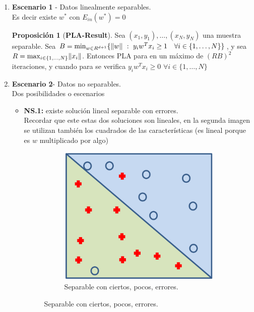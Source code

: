 \documentclass[11pt,a4paper]{article}
\DeclarePairedDelimiter{\norm}{\lVert}{\rVert}
\theoremstyle{definition}
\newtheorem{proposition}{Proposición}[section]
\begin{document}
	\begin{enumerate}
	\item \textbf{Escenario 1} - Datos linealmente separables.\\
	Es decir existe $w^*$ con $E_{in}(w^*)=0$
	\begin{proposition}[\hypertarget{plaResult}{\bf PLA-Result}]
		Sea $(x_1,y_1),\ldots,(x_N,y_N)$ una muestra separable. Sea $B=\min_{w\in R^{d+1}} \{\norm{w} \ : \ y_i w^T x_i \geq 1 \quad \forall i \in \{1,\ldots,N\}\}$, y sea $R=\max_{i\in \{1,\ldots,N\}} \norm{x_i}$. Entonces PLA para en un máximo de $(RB)^2$ iteraciones, y cuando para se verifica  $y_iw^Tx_i \geq 0$ $\forall i \in \{1,\ldots, N\}$
	\end{proposition}
	\item \textbf{Escenario 2}- Datos no separables.\\
	Dos posibilidades o escenarios
	\begin{itemize}
	\item \textbf{NS.1:} existe solución lineal separable con errores.\\ 
	Recordar que este estas dos soluciones son lineales, en la segunda imagen se utilizan también los cuadrados de las características (es lineal porque es $w$ multiplicado por algo)
	\begin{figure}[H]
		\centering
		\begin{subfigure}{.3\textwidth}
  		\centering
  		\includegraphics[width=1\textwidth]{images/non_sep_rectaa}
  		\caption{Separable con ciertos, pocos, errores.}

\end{subfigure}
\end{figure}
\end{itemize}
\end{enumerate}
\end{document}
